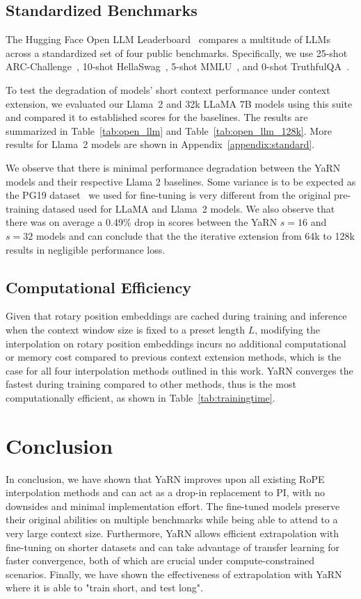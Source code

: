 \subsection{Standardized Benchmarks}

The Hugging Face Open LLM Leaderboard~\citep{openllm} compares a multitude of LLMs across a standardized set of four public benchmarks. Specifically, we use 25-shot ARC-Challenge~\citep{clark2018think}, 10-shot HellaSwag~\citep{zellers2019hellaswag}, 5-shot MMLU~\citep{hendryckstest2021}, and 0-shot TruthfulQA~\citep{lin-etal-2022-truthfulqa}.

To test the degradation of models' short context performance under context extension, we evaluated our Llama~2 and 32k LLaMA 7B models using this suite and compared it to established scores for the baselines. The results are summarized in Table~\ref{tab:open_llm} and Table~\ref{tab:open_llm_128k}. More results for Llama~2 models are shown in Appendix~\ref{appendix:standard}.

We observe that there is minimal performance degradation between the YaRN models and their respective Llama 2 baselines. Some variance is to be expected as the PG19 dataset~\citep{Rae2020Compressive} we used for fine-tuning is very different from the original pre-training datased used for LLaMA and Llama~2 models. We also observe that there was on average a 0.49\% drop in scores between the YaRN $s=16$ and $s=32$ models and can conclude that the the iterative extension from 64k to 128k results in negligible performance loss.

\subsection{Computational Efficiency}

Given that rotary position embeddings are cached during training and inference when the context window size is fixed to a preset length $L$, modifying the interpolation on rotary position embeddings incurs no additional computational or memory cost compared to previous context extension methods, which is the case for all four interpolation methods outlined in this work. YaRN converges the fastest during training compared to other methods, thus is the most computationally efficient, as shown in Table~\ref{tab:trainingtime}.

\section{Conclusion}
In conclusion, we have shown that YaRN improves upon all existing RoPE interpolation methods and can act as a drop-in replacement to PI, with no downsides and minimal implementation effort. The fine-tuned models preserve their original abilities on multiple benchmarks while being able to attend to a very large context size. Furthermore, YaRN allows efficient extrapolation with fine-tuning on shorter datasets and can take advantage of transfer learning for faster convergence, both of which are crucial under compute-constrained scenarios. Finally, we have shown the effectiveness of extrapolation with YaRN where it is able to "train short, and test long".

